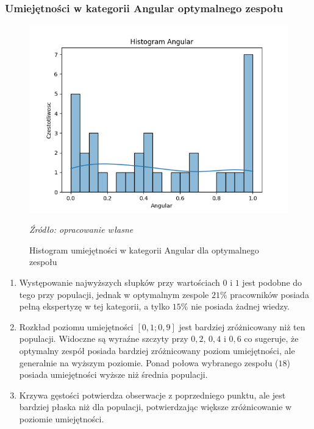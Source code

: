         \subsubsection{Umiejętności w kategorii Angular optymalnego zespołu}
        \begin{figure}[H]
            \centering
            \includegraphics[width=\linewidth]{chapters/Images/hist_angular_optimal.png}
            \cprotect\caption{Histogram umiejętności w kategorii Angular dla optymalnego zespołu}
            \textit{Źródło: opracowanie własne} 
            \label{fig:hist_angular_optimal}
        \end{figure}

        \begin{enumerate}
            \item Występowanie najwyższych słupków przy wartościach $0$ i $1$ jest podobne do tego przy populacji, jednak w optymalnym zespole $21\%$ pracowników posiada pełną ekspertyzę w tej kategorii, a tylko $15\%$ nie posiada żadnej wiedzy.
            \item Rozkład poziomu umiejętności $[0,1; 0,9]$ jest bardziej zróżnicowany niż ten populacji. Widoczne są wyraźne szczyty przy $0,2$, $0,4$ i $0,6$ co sugeruje, że optymalny zespół posiada bardziej zróżnicowany poziom umiejętności, ale generalnie na wyższym poziomie. Ponad połowa wybranego zespołu ($18$) posiada umiejętności wyższe niż średnia populacji.
            \item Krzywa gęstości potwierdza obserwacje z poprzedniego punktu, ale jest bardziej płaska niż dla populacji, potwierdzając większe zróżnicowanie w poziomie umiejętności.
        \end{enumerate}
        
